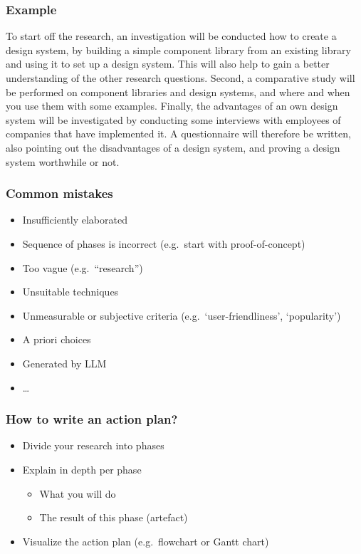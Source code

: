 \documentclass[aspectratio=169]{beamer}
\begin{document}
\begin{frame}
  \frametitle{Example}
  \small
  To start off the research, an investigation will be conducted how to create a design system, by building a simple component library from an existing library and using it to set up a design system. This will also help to gain a better understanding of the other research questions. Second, a comparative study will be performed on component libraries and design systems, and where and when you use them with some examples. Finally, the advantages of an own design system will be investigated by conducting some interviews with employees of companies that have implemented it. A questionnaire will therefore be written, also pointing out the disadvantages of a design system, and proving a design system worthwhile or not.

\end{frame}

\begin{frame}
  \frametitle{Common mistakes}

  \begin{itemize}
    \item Insufficiently elaborated
    \item Sequence of phases is incorrect (e.g.\ start with proof-of-concept)
    \item Too vague (e.g.\ ``research'')
    \item Unsuitable techniques
    \item Unmeasurable or subjective criteria (e.g.\ `user-friendliness', `popularity')
    \item A priori choices
    \item Generated by LLM
    \item \ldots
  \end{itemize}

\end{frame}


\begin{frame}
  \frametitle{How to write an action plan?}

  \begin{itemize}
    \item Divide your research into phases
    \item Explain in depth per phase
          \begin{itemize}
            \item What you will do
            \item The result of this phase (artefact)
          \end{itemize}
    \item Visualize the action plan (e.g.\ flowchart or Gantt chart)
  \end{itemize}
\end{frame}
\end{document}
